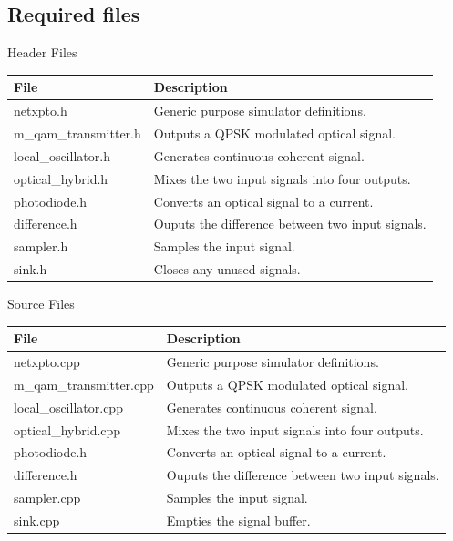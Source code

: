 \subsection*{Required files}\label{Required files}

Header Files
\begin{table}[H]
\centering
\begin{tabulary}{1.0\textwidth}{|L|L|}
\hline
\textbf{File}           & \textbf{Description}\\
\hline
netxpto.h               & Generic purpose simulator definitions.\\
\hline
m\_qam\_transmitter.h   & Outputs a QPSK modulated optical signal.\\
\hline
local\_oscillator.h     & Generates continuous coherent signal.\\
\hline
optical\_hybrid.h       & Mixes the two input signals into four outputs.\\
\hline
photodiode.h            & Converts an optical signal to a current.\\
\hline
difference.h            & Ouputs the difference between two input signals.\\
\hline
sampler.h               & Samples the input signal.\\
\hline
sink.h                  & Closes any unused signals.\\
\hline
\end{tabulary}
\end{table}
%
%
Source Files
\begin{table}[H]
\centering
\begin{tabulary}{1.0\textwidth}{|L|L|}
\hline
\textbf{File}                   & \textbf{Description}\\
\hline
netxpto.cpp                     & Generic purpose simulator definitions.\\
\hline
m\_qam\_transmitter.cpp         & Outputs a QPSK modulated optical signal.\\
\hline
local\_oscillator.cpp           & Generates continuous coherent signal.\\
\hline
optical\_hybrid.cpp             & Mixes the two input signals into four outputs.\\
\hline
photodiode.h                    & Converts an optical signal to a current.\\
\hline
difference.h                    & Ouputs the difference between two input signals.\\
\hline
sampler.cpp                     & Samples the input signal.\\
\hline
sink.cpp                        & Empties the signal buffer.\\
\hline
\end{tabulary}
\end{table}



